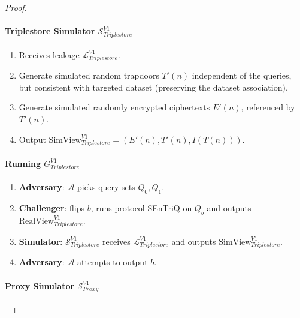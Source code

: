 \begin{proof} \hfill

    \paragraph{Triplestore Simulator $\mathcal{S}_{Triplestore}^{V1}$}

    \begin{enumerate}
        \item Receives leakage $\mathcal{L}_{Triplestore}^{V1}$.
        \item Generate simulated random trapdoors $T'(n)$ independent of the queries, but consistent with targeted dataset (preserving the dataset association).
        \item Generate simulated randomly encrypted ciphertexts $E'(n)$, referenced by $T'(n)$.
        \item Output $\mathrm{SimView}_{Triplestore}^{V1} = (E'(n), T'(n), I(T(n)))$.
    \end{enumerate}

    \paragraph{Running $G^{V1}_{Triplestore}$}

    \begin{enumerate}
        \item \textbf{Adversary}: $\mathcal{A}$ picks query sets $Q_0, Q_1$.
        \item \textbf{Challenger}: flips $b$, runs protocol \gls{SEnTriQ} on $Q_b$ and outputs \linebreak$\mathrm{RealView}^{V1}_{Triplestore}$.
        \item \textbf{Simulator}: $\mathcal{S}_{Triplestore}^{V1}$ receives $\mathcal{L}_{Triplestore}^{V1}$ and outputs $\mathrm{SimView}_{Triplestore}^{V1}$.
        \item \textbf{Adversary}: $\mathcal{A}$ attempts to output $b$. 
    \end{enumerate}

    \paragraph{Proxy Simulator $\mathcal{S}_{Proxy}^{V1}$}


\end{proof}
